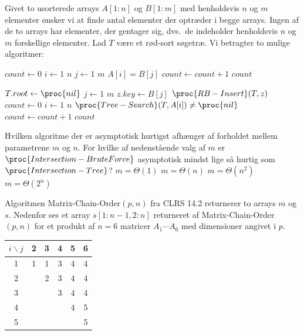 Givet to usorterede arrays $A[1:n]$ og $B[1:m]$ med henholdsvis $n$ og $m$ elementer ønsker vi at finde antal elementer der optræder i begge arrays.
Ingen af de to arrays har elementer, der gentager sig, dvs.~de indeholder henholdsvis $n$ og $m$ forskellige elementer.
Lad $T$ være et rød-sort søgetræ. Vi betragter to mulige algoritmer:
\begin{codebox}
\li $count \gets 0$
\li \For $i \gets 1$ \To $n$ 
\li \Do
        \For $j \gets 1$ \To $m$
\li     \Do
            \If $A[i] = B[j]$ 
\li         \Then $count \gets count + 1$
            \End
        \End
    \End
\li \Return $count$
\end{codebox}
\begin{codebox}
\li $T.root \gets \proc{nil}$ 
\li \For $j \gets 1$ \To $m$
\li \Do {}
\li $z.key \gets B[j]$
\li $\proc{RB-Insert}(T, z)$ \End
\li $count \gets 0$
\li \For $i \gets 1$ \To $n$
\li \Do
        \If $\proc{Tree-Search}(T, A[i]) \neq \proc{nil}$
\li     \Then $count \gets count + 1$
     \End
    \End
\li \Return $count$
\end{codebox}
Hvilken algoritme der er asymptotisk hurtigst afhænger af forholdet mellem parametrene $m$ og $n$.
For hvilke af nedenstående valg af $m$ er $\proc{Intersection-BruteForce}$ asymptotisk mindst lige så hurtig som $\proc{Intersection-Tree}$?
\fleresvar
\mulighederstart
\svar $m = \Theta(1)$\korrekt
\svar $m = \Theta(n)$
\svar $m = \Theta(n^2)$
\svar $m = \Theta(2^n)$\korrekt
\mulighederslut
{}

Algoritmen {\sc Matrix-Chain-Order}$(p,n)$ fra CLRS 14.2 returnerer to arrays $m$ og $s$.
Nedenfor ses et array $s[1:n-1, 2:n]$ returneret af {\sc Matrix-Chain-Order}$(p,n)$ for et produkt af $n=6$ matricer $A_1\cdots A_6$ med dimensioner angivet i $p$.
\medskip

\begin{tabular}{c|ccccc}
$i \backslash j$ & 2 & 3 & 4 & 5 & 6 \\
\hline
1 & 1 & 1 & 3 & 4 & 4 \\
2 &   & 2 & 3 & 4 & 4 \\
3 &   &   & 3 & 4 & 4 \\
4 &   &   &   & 4 & 5 \\
5 &   &   &   &   & 5 \\
\end{tabular}


